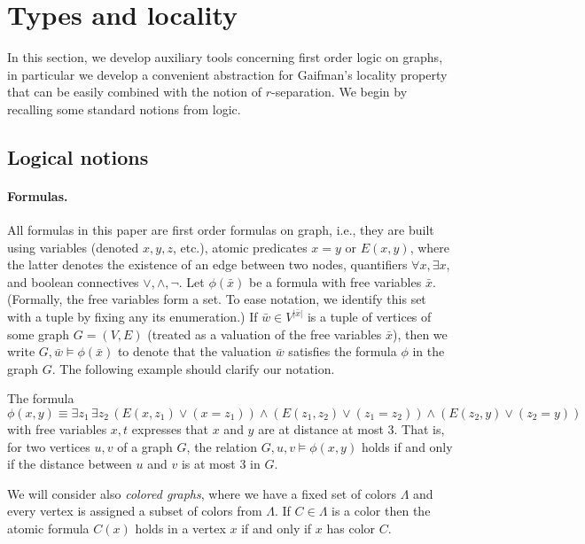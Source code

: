 \section{Types and locality}\label{sec:gaifman}
In this section, we develop auxiliary tools concerning first order logic on graphs, 
in particular we develop a convenient abstraction for Gaifman's locality property that can be easily combined with the notion of $r$-separation.
We begin by recalling some standard notions from logic.

\subsection{Logical notions}

\paragraph{Formulas.}
All formulas in this paper are first order formulas on graph,
i.e., they are built using variables (denoted $x,y,z$, etc.),
atomic predicates $x=y$ or $E(x,y)$,
where the latter denotes the existence of an edge between two nodes, quantifiers $\forall x,\exists x$, and boolean connectives $\lor,\land,\neg$. 
Let $\phi(\bar x)$ be a formula with free variables 
$\bar x$. (Formally, the free variables form a set.
To ease notation, we identify this set with a tuple by fixing any its enumeration.)
If $\bar w\in V^{|\bar x|}$ is a tuple of vertices of some graph $G=(V,E)$ (treated as a valuation of the free variables $\bar x$), then we write $G,\bar w\models \phi(\bar x)$
to denote that the valuation $\bar w$ satisfies the formula $\phi$ in the graph $G$.
The following example should clarify our notation.

\begin{example}\label{ex:dist-formula}
The formula
$$\phi(x,y)\equiv \exists z_1\, \exists z_2\, (E(x,z_1)\lor (x=z_1))\land (E(z_1,z_2)\lor (z_1=z_2))\land (E(z_2,y)\lor (z_2=y))$$
with free variables $x,t$ expresses that $x$ and $y$ are at distance at most $3$.
That is, for two vertices $u,v$ of a graph $G$,
the relation $G,u,v\models \phi(x,y)$ holds 
if and only if the distance between $u$ and $v$ is at most $3$ in $G$.
\end{example}

We will consider also \emph{colored graphs},
where we have a fixed set of colors $\Lambda$ and every vertex is assigned a subset of colors from 
$\Lambda$. If $C\in \Lambda$ is a color then the atomic formula $C(x)$ holds in a vertex $x$ if and only if $x$ has color $C$.

